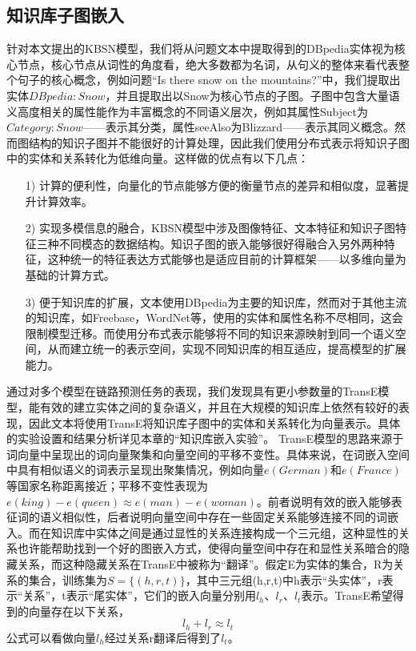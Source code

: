 \subsection{知识库子图嵌入}
针对本文提出的KBSN模型，我们将从问题文本中提取得到的DBpedia实体视为核心节点，核心节点从词性的角度看，绝大多数都为名词，从句义的整体来看代表整个句子的核心概念，例如问题“Is there snow on the mountains?”中，我们提取出实体$DBpedia:Snow$，并且提取出以Snow为核心节点的子图。子图中包含大量语义高度相关的属性能作为丰富概念的不同语义层次，例如其属性Subject为$Category:Snow$——表示其分类，属性seeAlso为Blizzard——表示其同义概念。然而图结构的知识子图并不能很好的计算处理，因此我们使用分布式表示将知识子图中的实体和关系转化为低维向量。这样做的优点有以下几点：
\begin{itemize}
  \item [1)] 
  计算的便利性，向量化的节点能够方便的衡量节点的差异和相似度，显著提升计算效率。 
  \item [2)]
  实现多模信息的融合，KBSN模型中涉及图像特征、文本特征和知识子图特征三种不同模态的数据结构。知识子图的嵌入能够很好得融合入另外两种特征，这种统一的特征表达方式能够也是适应目前的计算框架——以多维向量为基础的计算方式。
  \item [3)]
  便于知识库的扩展，文本使用DBpedia为主要的知识库，然而对于其他主流的知识库，如Freebase，WordNet等，使用的实体和属性名称不尽相同，这会限制模型迁移。而使用分布式表示能够将不同的知识来源映射到同一个语义空间，从而建立统一的表示空间，实现不同知识库的相互适应，提高模型的扩展能力。
\end{itemize}

通过对多个模型在链路预测任务的表现，我们发现具有更小参数量的TransE模型，能有效的建立实体之间的复杂语义，并且在大规模的知识库上依然有较好的表现，因此文本将使用TransE将知识库子图中的实体和关系转化为向量表示。具体的实验设置和结果分析详见本章的“知识库嵌入实验”。
TransE模型的思路来源于词向量中呈现出的词向量聚集和向量空间的平移不变性。具体来说，在词嵌入空间中具有相似语义的词表示呈现出聚集情况，例如向量$e(German)$和$e(France)$等国家名称距离接近；平移不变性表现为$e(king)-e(queen)\approx e(man)-e(woman)$。前者说明有效的嵌入能够表征词的语义相似性，后者说明向量空间中存在一些固定关系能够连接不同的词嵌入。而在知识库中实体之间是通过显性的关系连接构成一个三元组，这种显性的关系也许能帮助找到一个好的图嵌入方式，使得向量空间中存在和显性关系暗合的隐藏关系，而这种隐藏关系在TransE中被称为“翻译”。假定E为实体的集合，R为关系的集合，训练集为$S=\{(h,r,t)\}$，其中三元组(h,r,t)中h表示“头实体”，r表示“关系”，t表示“尾实体”，它们的嵌入向量分别用$l_h$、$l_r$、$l_t$表示。TransE希望得到的向量存在以下关系，
\begin{equation}
l_h+l_r \approx l_t
\end{equation}
公式可以看做向量$l_h$经过关系r翻译后得到了$l_t$。

